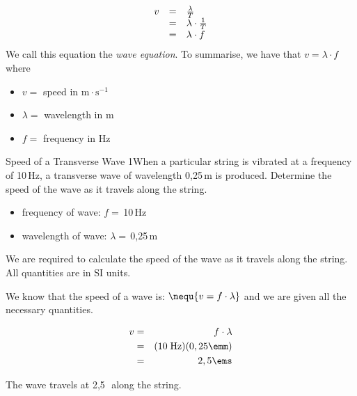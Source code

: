 \begin{definition}
    \begin{equation}
    \begin{array}{ccc}\hfill v& =& \frac{\lambda }{T}\hfill \\ & =& \lambda \ensuremath{\cdot}\frac{1}{T}\hfill \\ & =& \lambda \ensuremath{\cdot}f\hfill \end{array}
      \end{equation}
        \label{m38806*id319870}We call this equation the \textsl{wave equation}. To summarise, we have that $v=\lambda \ensuremath{\cdot}f$ where\par 
        \label{m38806*id319901}\begin{itemize}[noitemsep]
            \label{m38806*uid22}\item $v=$ speed in $\mathrm{m}\ensuremath{\cdot}\mathrm{s}{}^{-1}$\label{m38806*uid23}\item $\lambda =$ wavelength in $\mathrm{m}$
\label{m38806*uid24}\item $f=$ frequency in $\mathrm{Hz}$
\end{itemize}
\par
            \label{m38806*secfhsst!!!underscore!!!id705}\vspace{.5cm} 
      \noindent
\begin{wex}{Speed of a Transverse Wave 1}{When a particular string is vibrated at a frequency of 10\,Hz, a transverse wave of wavelength 0,25\,m is produced. Determine the speed of the wave as it travels along the string.}
{
\begin{itemize}
\item{frequency of wave: $f=$\,10\,Hz}
\item{wavelength of wave: $\lambda=$\,0,25\,m}
\end{itemize}
We are required to calculate the speed of the wave as it travels along the string. All quantities are in SI units.

We know that the speed of a wave is:
$\nequ{v=f\cdot \lambda}$
and we are given all the necessary quantities.

\begin{eqnarray*}
v&=&f\cdot \lambda\\
&=&(10\;\mathrm{Hz})(0,25\emm)\\
&=&2,5\ems
\end{eqnarray*}

The wave travels at 2,5\,\ms\ along the string.
}
\end{wex}



\end{definition}
